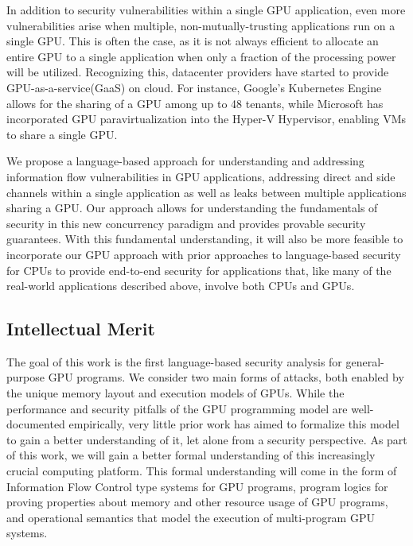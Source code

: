 In addition to security vulnerabilities within a single GPU application, even more vulnerabilities arise when multiple, non-mutually-trusting applications run on a single GPU.
%
This is often the case, as it is not always efficient to allocate an entire GPU to a single application when only a fraction of the processing power will be utilized.
%
Recognizing this, datacenter providers have started to provide GPU-as-a-service(GaaS) on cloud.
%
For instance, Google's Kubernetes Engine allows for the sharing of a GPU among up to 48 tenants, while Microsoft has incorporated GPU paravirtualization into the Hyper-V Hypervisor, enabling VMs to share a single GPU.

%
%

%

We propose a language-based approach for understanding and addressing information flow vulnerabilities in GPU applications, addressing direct and side channels within a single application as well as leaks between multiple applications sharing a GPU.
%
Our approach allows for understanding the fundamentals of security in this new concurrency paradigm and provides provable security guarantees.
%
With this fundamental understanding, it will also be more feasible to incorporate our GPU approach with prior approaches to language-based security for CPUs to provide end-to-end security for applications that, like many of the real-world applications described above, involve both CPUs and GPUs.


\subsection{Intellectual Merit}
The goal of this work is the first language-based security analysis for general-purpose GPU programs.
%
We consider two main forms of attacks, both enabled by the unique memory
layout and execution models of GPUs.
%
While the performance and security pitfalls of the GPU programming model are well-documented empirically, very little prior work has aimed to formalize this model to gain a better understanding of it, let alone from a security perspective.
%
As part of this work, we will gain a better formal understanding of this increasingly crucial computing platform.
%
This formal understanding will come in the form of Information Flow Control type systems for GPU programs, program logics for proving properties about memory and other resource usage of GPU programs, and operational semantics that model the execution of multi-program GPU systems.

